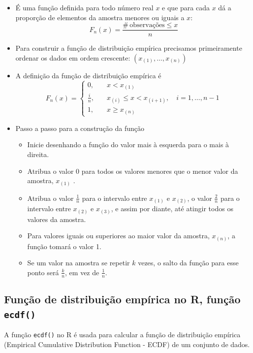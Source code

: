 \documentclass[
]{book}
\providecommand{\tightlist}{%
  \setlength{\itemsep}{0pt}\setlength{\parskip}{0pt}}
\begin{document}
\begin{itemize}
\item
  É uma função definida para todo número real \(x\) e que para cada \(x\) dá a proporção de elementos da amostra menores ou iguais a \(x\):
  \[F_{n}(x) = \frac{\# \, \text{observações} \leq x}{n}\]
\item
  Para construir a função de distribuição empírica precisamos primeiramente ordenar os dados em ordem crescente: \((x_{(1)},\ldots,x_{(n)})\)
\item
  A definição da função de distribuição empírica é
  \[F_{n}(x) = \begin{cases}
    0, & \quad x < x_{(1)} \\
    \frac{i}{n}, & \quad x_{(i)}\leq x < x_{(i+1)}, \quad i=1,\ldots,n-1 \\
    1, & \quad x\geq x_{(n)}
  \end{cases}\]
\item
  Passo a passo para a construção da função

  \begin{itemize}
  \tightlist
  \item
    Inicie desenhando a função do valor mais à esquerda para o mais à direita.
  \item
    Atribua o valor 0 para todos os valores menores que o menor valor da amostra, \(x_{(1)}\) .
  \item
    Atribua o valor \(\frac{1}{n}\) para o intervalo entre \(x_{(1)}\) e \(x_{(2)}\), o valor \(\frac{2}{n}\) para o intervalo entre \(x_{(2)}\) e \(x_{(3)}\), e assim por diante, até atingir todos os valores da amostra.
  \item
    Para valores iguais ou superiores ao maior valor da amostra, \(x_{(n)}\), a função tomará o valor 1.
  \item
    Se um valor na amostra se repetir \(k\) vezes, o salto da função para esse ponto será \(\frac{k}{n}\), em vez de \(\frac{1}{n}\).
  \end{itemize}
\end{itemize}

\subsection{\texorpdfstring{Função de distribuição empírica no R, função \texttt{ecdf()}}{Função de distribuição empírica no R, função ecdf()}}\label{funuxe7uxe3o-de-distribuiuxe7uxe3o-empuxedrica-no-r-funuxe7uxe3o-ecdf}

A função \texttt{ecdf()} no R é usada para calcular a função de distribuição empírica (Empirical Cumulative Distribution Function - ECDF) de um conjunto de dados.
\end{document}
